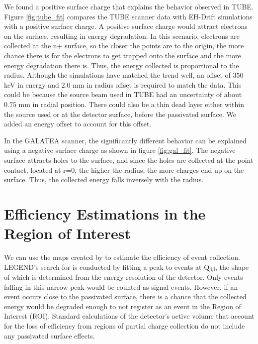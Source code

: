 We found a positive surface charge that explains the behavior observed in TUBE. Figure \ref{fig:tube_fit} compares the TUBE scanner data with EH-Drift simulations with a positive surface charge. A positive surface charge would attract electrons on the surface, resulting in energy degradation. In this scenario, electrons are collected at the n+ surface, so the closer the points are to the origin, the more chance there is for the electrons to get trapped onto the surface and the more energy degradation there is. Thus, the energy collected is proportional to the radius. Although the simulations have matched the trend well, an offset of $350$ keV in energy and $2.0$ mm in radius offset is required to match the data. This could be because the source beam used in TUBE had an uncertainty of about $0.75$ mm in radial position. There could also be a thin dead layer either within the source used or at the detector surface, before the passivated surface. We added an energy offset to account for this offset.

In the GALATEA scanner, the significantly different behavior can be explained using a negative surface charge as shown in figure \ref{fig:gal_fit}. The negative surface attracts holes to the surface, and since the holes are collected at the point contact, located at r=0, the higher the radius, the more charges end up on the surface. Thus, the collected energy falls inversely with the radius.

\section{Efficiency Estimations in the Region of Interest}
\label{ch5_res_efficiency} 
We can use the maps created by {\ehd} to estimate the efficiency of {\onbb} event collection. LEGEND's search for {\onbb} is conducted by fitting a peak to events at Q$_{\beta \beta}$, the shape of which is determined from the energy resolution of the detector. Only events falling in this narrow peak would be counted as {\onbb} signal events. However, if an event occurs close to the passivated surface, there is a chance that the collected energy would be degraded enough to not register as an event in the Region of Interest (ROI). Standard calculations of the detector's active volume that account for the loss of efficiency from regions of partial charge collection do not include any passivated surface effects. 


